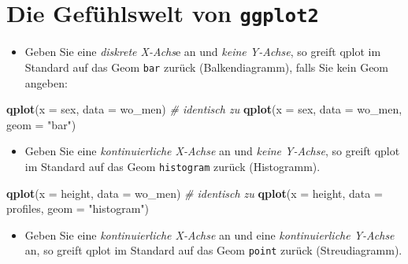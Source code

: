 \documentclass[12pt,ngerman,]{book}
\makeatletter
\newenvironment{Shaded}{\begin{snugshade}}{\end{snugshade}}
\newcommand{\KeywordTok}[1]{\textcolor[rgb]{0.13,0.29,0.53}{\textbf{{#1}}}}
\newcommand{\DataTypeTok}[1]{\textcolor[rgb]{0.13,0.29,0.53}{{#1}}}
\newcommand{\StringTok}[1]{\textcolor[rgb]{0.31,0.60,0.02}{{#1}}}
\newcommand{\CommentTok}[1]{\textcolor[rgb]{0.56,0.35,0.01}{\textit{{#1}}}}
\newcommand{\NormalTok}[1]{{#1}}
\providecommand{\tightlist}{%
  \setlength{\itemsep}{0pt}\setlength{\parskip}{0pt}}
\newenvironment{kframe}{%
\medskip{}
\setlength{\fboxsep}{.8em}
 \def\at@end@of@kframe{}%
 \ifinner\ifhmode%
  \def\at@end@of@kframe{\end{minipage}}%
  \begin{minipage}{\columnwidth}%
 \fi\fi%
 \def\FrameCommand##1{\hskip\@totalleftmargin \hskip-\fboxsep
 \colorbox{shadecolor}{##1}\hskip-\fboxsep
     \hskip-\linewidth \hskip-\@totalleftmargin \hskip\columnwidth}%
 \MakeFramed {\advance\hsize-\width
   \@totalleftmargin\z@ \linewidth\hsize
   \@setminipage}}%
 {\par\unskip\endMakeFramed%
 \at@end@of@kframe}
\renewenvironment{Shaded}{\begin{kframe}}{\end{kframe}}
\makeatother
\begin{document}
\section{\texorpdfstring{Die Gefühlswelt von
\texttt{ggplot2}}{Die Gefühlswelt von ggplot2}}\label{die-gefuhlswelt-von-ggplot2}

\begin{itemize}
\tightlist
\item
  Geben Sie eine \emph{diskrete X-Achs}e an und \emph{keine Y-Achse}, so
  greift qplot im Standard auf das Geom \texttt{bar} zurück
  (Balkendiagramm), falls Sie kein Geom angeben:
\end{itemize}

\begin{Shaded}
\begin{Highlighting}[]
\KeywordTok{qplot}\NormalTok{(}\DataTypeTok{x =} \NormalTok{sex, }\DataTypeTok{data =} \NormalTok{wo_men)  }\CommentTok{# identisch zu}
\KeywordTok{qplot}\NormalTok{(}\DataTypeTok{x =} \NormalTok{sex, }\DataTypeTok{data =} \NormalTok{wo_men, }\DataTypeTok{geom =} \StringTok{"bar"}\NormalTok{)}
\end{Highlighting}
\end{Shaded}

\begin{itemize}
\tightlist
\item
  Geben Sie eine \emph{kontinuierliche X-Achse} an und \emph{keine
  Y-Achse}, so greift qplot im Standard auf das Geom \texttt{histogram}
  zurück (Histogramm).
\end{itemize}

\begin{Shaded}
\begin{Highlighting}[]
\KeywordTok{qplot}\NormalTok{(}\DataTypeTok{x =} \NormalTok{height, }\DataTypeTok{data =} \NormalTok{wo_men)  }\CommentTok{# identisch zu}
\KeywordTok{qplot}\NormalTok{(}\DataTypeTok{x =} \NormalTok{height, }\DataTypeTok{data =} \NormalTok{profiles, }\DataTypeTok{geom =} \StringTok{"histogram"}\NormalTok{)}
\end{Highlighting}
\end{Shaded}

\begin{itemize}
\tightlist
\item
  Geben Sie eine \emph{kontinuierliche X-Achse} an und eine
  \emph{kontinuierliche Y-Achse} an, so greift qplot im Standard auf das
  Geom \texttt{point} zurück (Streudiagramm).
\end{itemize}
\end{document}
